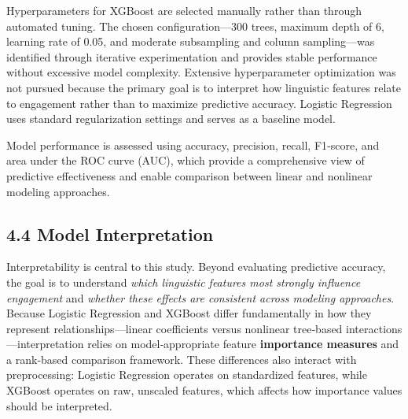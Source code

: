 Hyperparameters for XGBoost are selected manually rather than through
automated tuning. The chosen configuration---300 trees, maximum depth of
6, learning rate of 0.05, and moderate subsampling and column
sampling---was identified through iterative experimentation and provides
stable performance without excessive model complexity. Extensive
hyperparameter optimization was not pursued because the primary goal is
to interpret how linguistic features relate to engagement rather than to
maximize predictive accuracy. Logistic Regression uses standard
regularization settings and serves as a baseline model.

Model performance is assessed using accuracy, precision, recall,
F1‑score, and area under the ROC curve (AUC), which provide a
comprehensive view of predictive effectiveness and enable comparison
between linear and nonlinear modeling approaches.

\hypertarget{model-interpretation}{%
\subsection{4.4 Model Interpretation}\label{model-interpretation}}

Interpretability is central to this study. Beyond evaluating predictive
accuracy, the goal is to understand \emph{which linguistic features most
strongly influence engagement} and \emph{whether these effects are
consistent across modeling approaches}. Because Logistic Regression and
XGBoost differ fundamentally in how they represent
relationships---linear coefficients versus nonlinear tree‑based
interactions---interpretation relies on model‑appropriate feature
\textbf{importance measures} and a rank‑based comparison framework.
These differences also interact with preprocessing: Logistic Regression
operates on standardized features, while XGBoost operates on raw,
unscaled features, which affects how importance values should be
interpreted.

